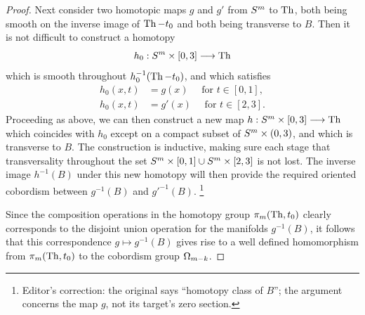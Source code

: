 \documentclass[../main]{subfiles}
\begin{document}
\begin{proof}
Next consider two homotopic maps $g$ and $g'$ from $S^m$ to $\operatorname{Th}$, both being smooth on the inverse image of $\operatorname{Th} - t_0$ and both being transverse to $B$. Then it is not difficult to construct a homotopy \[h_0 : S^m \times [0, 3] \longrightarrow \operatorname{Th}\] which is smooth throughout $h_0^{-1}(\operatorname{Th} - t_0)$, and which satisfies
\begin{align*}
h_0(x, t) & = g(x) \quad \text { for } t \in [0, 1], \\ h_0(x, t) & = g'(x) \quad \text { for } t \in [2, 3].
\end{align*}
Proceeding as above, we can then construct a new map $h : S^m \times [0, 3] \longrightarrow \operatorname{Th}$ which coincides with $h_0$ except on a compact subset of $S^m \times (0, 3)$, and which is transverse to $B$. The construction is inductive, making sure each stage that transversality throughout the set $S^m \times [0, 1] \cup S^m \times [2, 3]$ is not lost. The inverse image $h^{-1}(B)$ under this new homotopy will then provide the required oriented cobordism between $g^{-1}(B)$ and ${g'}^{-1}(B)$. \footnote{Editor's correction: the original says ``homotopy class of $B$''; the argument concerns the map $g$, not its target's zero section.}

Since the composition operations in the homotopy group $\pi_m(\operatorname{Th}, t_0)$ clearly corresponds to the disjoint union operation for the manifolds $g^{-1}(B)$, it follows that this correspondence $g \mapsto g^{-1}(B)$ gives rise to a well defined homomorphism from $\pi_m(\operatorname{Th}, t_0)$ to the cobordism group $\Omega_{m - k}$. 
\end{proof}
\end{document}

